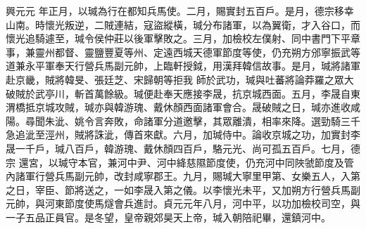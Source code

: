 \begin{pinyinscope}
 興元元
 年正月，以瑊為行在都知兵馬使。二月，賜實封五百戶。是月，德宗移幸山南。時懷光叛逆，二賊連結，寇盜縱橫，瑊分布諸軍，以為翼衛，才入谷口，而懷光追騎遽至，瑊令侯仲莊以後軍擊敗之。三月，加檢校左僕射、同中書門下平章事，兼靈州都督、靈鹽豐夏等州、定遠西城天德軍節度等使，仍充朔方邠寧振武等道兼永平軍奉天行營兵馬副元帥，上臨軒授鉞，用漢拜韓信故事。是月，瑊將諸軍赴京畿，賊將韓旻、張廷芝、宋歸朝等拒我
 師於武功，瑊與吐蕃將論莽羅之眾大破賊於武亭川，斬首萬餘級。瑊便赴奉天應接李晟，抗京城西面。五月，李晟自東渭橋抵京城攻賊，瑊亦與韓游瑰、戴休顏西面諸軍會合。晟破賊之日，瑊亦進收咸陽。尋聞朱泚、姚令言奔敗，命諸軍分道邀擊，其眾離潰，相率來降。選勁騎三千急追泚至涇州，賊將誅泚，傳首來獻。六月，加瑊侍中。論收京城之功，加實封李晟一千戶，瑊八百戶，韓游瑰、戴休顏四百戶，駱元光、尚可孤五百戶。七月，德宗
 還宮，以瑊守本官，兼河中尹、河中絳慈隰節度使，仍充河中同陜虢節度及管內諸軍行營兵馬副元帥，改封咸寧郡王。九月，賜瑊大寧里甲第、女樂五人，入第之日，宰臣、節將送之，一如李晟入第之儀。以李懷光未平，又加朔方行營兵馬副元帥，與河東節度使馬燧會兵進討。貞元元年八月，河中平，以功加檢校司空，與一子五品正員官。是冬望，皇帝親郊昊天上帝，瑊入朝陪祀畢，還鎮河中。




\end{pinyinscope}
